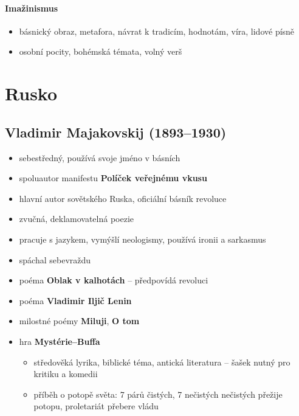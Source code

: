 \paragraph{Imažinismus}
\begin{itemize}
\item básnický obraz, metafora, návrat k tradicím, hodnotám, víra, lidové písně
\item osobní pocity, bohémská témata, volný verš
\end{itemize}


\section{Rusko}

\subsection{Vladimir Majakovskij (1893--1930)}
\begin{itemize}
\item sebestředný, používá svoje jméno v básních
\item spoluautor manifestu \textbf{Políček veřejnému vkusu}
\item hlavní autor sovětského Ruska, oficiální básník revoluce
\item zvučná, deklamovatelná poezie
\item pracuje s jazykem, vymýšlí neologismy, používá ironii a sarkasmus
\item spáchal sebevraždu
\item poéma \textbf{Oblak v kalhotách} -- předpovídá revoluci
\item poéma \textbf{Vladimir Iljič Lenin}
\item milostné poémy \textbf{Miluji}, \textbf{O tom}
\item hra \textbf{Mystérie--Buffa}
	\begin{itemize}
	\item středověká lyrika, biblické téma, antická literatura -- šašek nutný pro kritiku a komedii
	\item příběh o potopě světa: 7 párů čistých, 7 nečistých  nečistých přežije potopu, proletariát přebere vládu
	\end{itemize}
\end{itemize}

